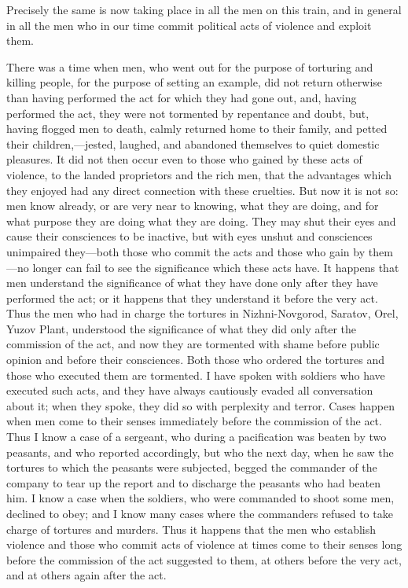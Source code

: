 \documentclass{book}
\begin{document}
Precisely the same is now taking place in all the men on this train, and in general in all the men who in our time commit political acts of violence and exploit them.

There was a time when men, who went out for the purpose of torturing and killing people, for the purpose of setting an example, did not return otherwise than having performed the act for which they had gone out, and, having performed the act, they were not tormented by repentance and doubt, but, having flogged men to death, calmly returned home to their family, and petted their children,—jested, laughed, and abandoned themselves to quiet domestic pleasures. It did not then occur even to those who gained by these acts of violence, to the landed proprietors and the rich men, that the advantages which they enjoyed had any direct connection with these cruelties. But now it is not so: men know already, or are very near to knowing, what they are doing, and for what purpose they are doing what they are doing. They may shut their eyes and cause their consciences to be inactive, but with eyes unshut and consciences unimpaired they—both those who commit the acts and those who gain by them—no longer can fail to see the significance which these acts have. It happens that men understand the significance of what they have done only after they have performed the act; or it happens that they understand it before the very act. Thus the men who had in charge the tortures in Nizhni-Novgorod, Saratov, Orel, Yuzov Plant, understood the significance of what they did only after the commission of the act, and now they are tormented with shame before public opinion and before their consciences. Both those who ordered the tortures and those who executed them are tormented. I have spoken with soldiers who have executed such acts, and they have always cautiously evaded all conversation about it; when they spoke, they did so with perplexity and terror. Cases happen when men come to their senses immediately before the commission of the act. Thus I know a case of a sergeant, who during a pacification was beaten by two peasants, and who reported accordingly, but who the next day, when he saw the tortures to which the peasants were subjected, begged the commander of the company to tear up the report and to discharge the peasants who had beaten him. I know a case when the soldiers, who were commanded to shoot some men, declined to obey; and I know many cases where the commanders refused to take charge of tortures and murders. Thus it happens that the men who establish violence and those who commit acts of violence at times come to their senses long before the commission of the act suggested to them, at others before the very act, and at others again after the act.
\end{document}
